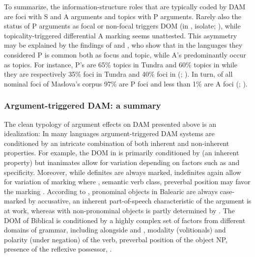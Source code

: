 \documentclass[output=paper]{LSP/langsci}
\begin{document}
To summarize, the information-structure roles that are typically coded by DAM are foci with S and A arguments and topics with P arguments. 
Rarely also the status of P arguments as focal or non-focal triggers DOM (\eg in , isolate; \citealt{Maslova2003Information, Maslova2008Case}), while topicality-triggered differential A marking seems unattested. 
This asymmetry may be explained by the findings of \citet{Maslova2003Information} and \citet{Dalrympleetal2011Objects}, who show that in the languages they considered P is common both as focus and topic, while A’s predominantly occur as topics. 
For instance, P’s are 65\% topics in Tundra  and 60\% topics in  while they are respectively 35\% foci in Tundra  and 40\% foci in  (\citealt[182]{Maslova2003Information}; \citealt[167]{Dalrympleetal2011Objects}). 
In turn, of all nominal foci of Maslova’s  corpus 97\% are P foci and less than 1\% are A foci (\citealt[182]{Maslova2003Information}; \citeyear[796]{Maslova2008Case}).


\subsubsection{Argument-triggered DAM: a summary}
\label{01-wi-sec:2.1.4-Argument-triggered-Summary}

The clean typology of argument effects on DAM presented above is an idealization: In many languages argument-triggered DAM systems are conditioned by an intricate combination of both inherent and non-inherent properties. 
For example, the DOM in  is primarily conditioned by  (an inherent property) but inanimates allow for variation depending on factors such as  and specificity. 
Moreover, while definites are always marked, indefinites again allow for variation of marking where , semantic verb class, preverbal position may favor the marking \citep{vonHeusingeretal2007Differential, vonHeusingeretal2011Affectedness}. 
According to \citet{Escandell-Vidal2009Differential}, pronominal objects in Balearic  are always case-marked by accusative, \ie an inherent part-of-speech characteristic of the argument is at work, whereas with non-pronominal objects  is partly determined by .
The DOM of Biblical  is conditioned by a highly complex set of factors from different domains of grammar, including alongside  and , modality (volitionals) and polarity (under negation) of the verb, preverbal position of the object NP, presence of the reflexive possessor, \etc \citep[173]{Bekins2012Information}.
\end{document}
